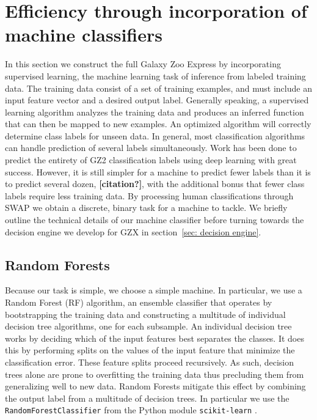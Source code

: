 \documentclass[twocolumn]{aastex6}
\begin{document}
\section{Efficiency through incorporation of machine classifiers} \label{sec: machine}

In this section we construct the full Galaxy Zoo Express by incorporating supervised 
learning, the machine learning task of inference from labeled training data. 
The training data consist of a set of training examples, and must include
an input feature vector and a desired output label.  Generally speaking,
a supervised learning algorithm analyzes the training data and produces an inferred 
function that can then be mapped to new examples. An optimized algorithm will 
correctly determine class labels for unseen data. In general, most classification 
algorithms can handle prediction of several labels simultaneously. Work has been
done to predict the entirety of GZ2 classification labels using deep learning 
\citep{Dieleman2015} with great success. 
However, it is still simpler for a machine to predict fewer labels than it is to predict several dozen, \textbf{[citation?]}, 
with the additional bonus that fewer class labels require less training data. 
By processing human classifications through SWAP we obtain a discrete, binary task
for a machine to tackle. We briefly outline the technical details of our machine
classifier before turning towards the decision engine we develop for GZX in 
section~\ref{sec: decision engine}. 


\subsection{Random Forests}
Because our task is simple, we choose a simple machine. In particular, we use 
a Random Forest (RF) algorithm,  an ensemble classifier that operates by bootstrapping
the training data and constructing a multitude of individual decision tree algorithms, 
one for each subsample.  An individual decision tree works by deciding which of 
the input features best separates the classes. It does this by performing 
splits on the values of the input feature that minimize the classification 
error. These feature splits proceed recursively. As such, decision trees alone are
 prone to overfitting the training data thus precluding them from generalizing 
well to new data. Random Forests mitigate this effect by combining the 
output label from a multitude of decision trees.  In particular we use the 
\texttt{RandomForestClassifier} from the Python module \texttt{scikit-learn}
\citep{scikit-learn}. 
\end{document}
